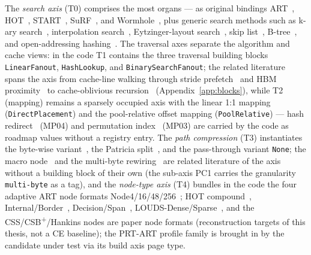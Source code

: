\begin{nurlang}
The \emph{search axis} (T0) comprises the most organs --- as original bindings ART~\cite{leis2013art},
HOT~\cite{binna2018hot}, START~\cite{fent2020start}, SuRF~\cite{zhang2018surf}, and
Wormhole~\cite{wu2019wormhole}, plus generic search methods such as k-ary search~\cite{schlegel2009kary},
interpolation search~\cite{perl1978interpolation}, Eytzinger-layout search~\cite{khuong2017eytzinger},
skip list~\cite{pugh1990skiplist}, B-tree~\cite{bayer1972btree}, and
open-addressing hashing~\cite{knuth1998taocp3}. The traversal axes separate the
algorithm and cache views: in the code T1 contains the three traversal building blocks
\texttt{Linear\allowbreak{}Fanout}, \texttt{Hash\allowbreak{}Lookup}, and
\texttt{Binary\allowbreak{}Search\allowbreak{}Fanout}; the related literature spans the axis from
cache-line walking through stride prefetch~\cite{chen2001prefetch} and HBM proximity~\cite{schmidt2025hbm} to
cache-oblivious recursion~\cite{frigo1999cache} (Appendix~\ref{app:blocks}), while T2 (mapping)
remains a sparsely occupied axis with the linear 1:1 mapping (\texttt{Direct\allowbreak{}Placement}) and the
pool-relative offset mapping (\texttt{Pool\allowbreak{}Relative}) --- hash
redirect~\cite{wu2019wormhole} (MP04) and permutation index~\cite{mao2012masstree} (MP03) are carried
by the code as roadmap values without a registry entry. The \emph{path compression} (T3)
instantiates the byte-wise variant~\cite{leis2013art}, the Patricia split~\cite{morrison1968patricia,binna2018hot},
and the pass-through variant \texttt{None}; the macro node~\cite{boffa2024coco} and the
multi-byte rewiring~\cite{fent2020start} are related literature of the axis without a building block of
their own (the sub-axis PC1 carries the granularity \texttt{multi-byte} as a tag), and the
\emph{node-type axis} (T4) bundles in the code the four adaptive ART node formats
Node4/16/48/256~\cite{leis2013art}; HOT compound~\cite{binna2018hot}, Internal/Border~\cite{mao2012masstree},
Decision/Span~\cite{schmeisser2022b2tree}, LOUDS-Dense/Sparse~\cite{zhang2018surf}, and the
CSS/CSB\textsuperscript{+}/Hankins nodes are paper node formats (reconstruction targets of this
thesis, not a CE baseline); the PRT-ART profile family is brought in by the candidate under test via its build axis page type.
\end{nurlang}
